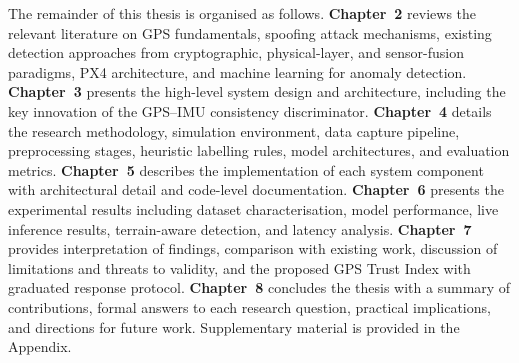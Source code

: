 The remainder of this thesis is organised as follows. \textbf{Chapter~2} reviews the relevant literature on GPS fundamentals, spoofing attack mechanisms, existing detection approaches from cryptographic, physical-layer, and sensor-fusion paradigms, PX4 architecture, and machine learning for anomaly detection. \textbf{Chapter~3} presents the high-level system design and architecture, including the key innovation of the GPS--IMU consistency discriminator. \textbf{Chapter~4} details the research methodology, simulation environment, data capture pipeline, preprocessing stages, heuristic labelling rules, model architectures, and evaluation metrics. \textbf{Chapter~5} describes the implementation of each system component with architectural detail and code-level documentation. \textbf{Chapter~6} presents the experimental results including dataset characterisation, model performance, live inference results, terrain-aware detection, and latency analysis. \textbf{Chapter~7} provides interpretation of findings, comparison with existing work, discussion of limitations and threats to validity, and the proposed GPS Trust Index with graduated response protocol. \textbf{Chapter~8} concludes the thesis with a summary of contributions, formal answers to each research question, practical implications, and directions for future work. Supplementary material is provided in the Appendix.
